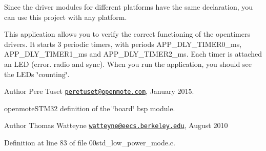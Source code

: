 Since the driver modules for different platforms have the same declaration, you can use this project with any platform.

This application allows you to verify the correct functioning of the opentimers drivers. It starts 3 periodic timers, with periods A\+P\+P\+\_\+\+D\+L\+Y\+\_\+\+T\+I\+M\+E\+R0\+\_\+ms, A\+P\+P\+\_\+\+D\+L\+Y\+\_\+\+T\+I\+M\+E\+R1\+\_\+ms and A\+P\+P\+\_\+\+D\+L\+Y\+\_\+\+T\+I\+M\+E\+R2\+\_\+ms. Each timer is attached an L\+ED (error. radio and sync). When you run the application, you should see the L\+E\+Ds \char`\"{}counting\char`\"{}.

\begin{DoxyAuthor}{Author}
Pere Tuset \href{mailto:peretuset@openmote.com}{\tt peretuset@openmote.\+com}, January 2015.
\end{DoxyAuthor}
openmote\+S\+T\+M32 definition of the \char`\"{}board\char`\"{} bsp module.

\begin{DoxyAuthor}{Author}
Thomas Watteyne \href{mailto:watteyne@eecs.berkeley.edu}{\tt watteyne@eecs.\+berkeley.\+edu}, August 2010 
\end{DoxyAuthor}


Definition at line 83 of file 00std\+\_\+low\+\_\+power\+\_\+mode.\+c.

